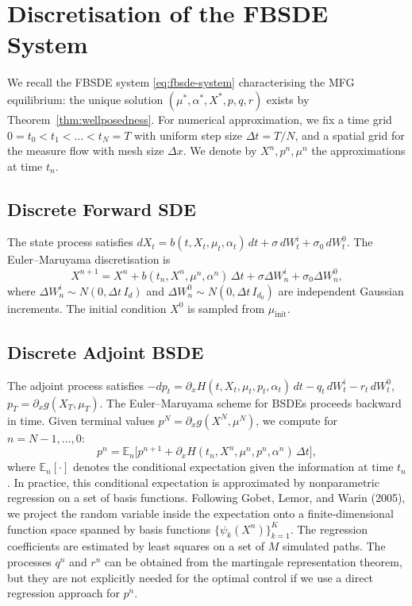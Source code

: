 \section{Discretisation of the FBSDE System}
\label{sec:na-discretisation}

We recall the FBSDE system \eqref{eq:fbsde-system} characterising the MFG
equilibrium: the unique solution $(\mu^*, \alpha^*, X^*, p, q, r)$ exists by
Theorem~\ref{thm:wellposedness}. For numerical
approximation, we fix a time grid $0 = t_0 < t_1 < \dots < t_N = T$ with uniform step
size $\Delta t = T/N$, and a spatial grid for the measure flow with mesh size
$\Delta x$. We denote by $X^n, p^n, \mu^n$ the approximations at time $t_n$.

\subsection{Discrete Forward SDE}

The state process satisfies $dX_t = b(t,X_t,\mu_t,\alpha_t)\, dt + \sigma\, dW_t^i +
\sigma_0\, dW_t^0$. The Euler--Maruyama discretisation is
\begin{equation}
    X^{n+1} = X^n + b(t_n, X^n, \mu^n, \alpha^n)\, \Delta t + \sigma \Delta W_n^i +
    \sigma_0 \Delta W_n^0,
    \label{eq:discrete-forward-sde}
\end{equation}
where $\Delta W_n^i \sim N(0, \Delta t \, I_d)$ and $\Delta W_n^0 \sim N(0, \Delta t \,
I_{d_0})$ are independent Gaussian increments. The initial condition $X^0$ is sampled
from $\mu_{\mathrm{init}}$.

\subsection{Discrete Adjoint BSDE}

The adjoint process satisfies $-dp_t = \partial_x H(t,X_t,\mu_t,p_t,\alpha_t)\, dt -
q_t\, dW_t^i - r_t\, dW_t^0$, $p_T = \partial_x g(X_T, \mu_T)$. The Euler--Maruyama
scheme for BSDEs proceeds backward in time. Given terminal values
$p^N = \partial_x g(X^N, \mu^N)$, we compute for $n = N-1, \dots, 0$:
\begin{equation}
    p^n = \mathbb{E}_n\big[ p^{n+1} + \partial_x H(t_n, X^n, \mu^n, p^n, \alpha^n)\,
    \Delta t \big],
    \label{eq:discrete-adjoint-bsde}
\end{equation}
where $\mathbb{E}_n[\cdot]$ denotes the conditional expectation given the information
at time $t_n$. In practice, this conditional expectation is approximated by
nonparametric regression on a set of basis functions. Following Gobet, Lemor, and
Warin (2005), we project the random variable inside the expectation onto a
finite-dimensional function space spanned by basis functions $\{\psi_k(X^n)\}_{k=1}^K$.
The regression coefficients are estimated by least squares on a set of $M$ simulated
paths. The processes $q^n$ and $r^n$ can be obtained from the martingale
representation theorem, but they are not explicitly needed for the optimal control if
we use a direct regression approach for $p^n$.

